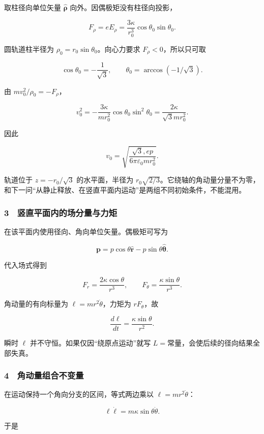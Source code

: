 \documentclass[12pt,a4paper,fontset=fandol]{ctexart}
\begin{document}
取柱径向单位矢量 \(\hat{\boldsymbol\rho}\)
向外。因偶极矩没有柱径向投影，

\[F_\rho=eE_\rho=
\frac{3\kappa}{r_0^3}\cos\theta_0\sin\theta_0.\]

圆轨道柱半径为 \(\rho_0=r_0\sin\theta_0\)。向心力要求
\(F_\rho<0\)，所以只可取

\[\boxed{\cos\theta_0=-\frac1{\sqrt3},\qquad
\theta_0=\arccos(-1/\sqrt3).}\]

由 \(m v_0^2/\rho_0=-F_\rho\)，

\[v_0^2=-\frac{3\kappa}{mr_0^2}
\cos\theta_0\sin^2\theta_0
=\frac{2\kappa}{\sqrt3mr_0^2}.\]

因此

\[\boxed{v_0=\sqrt{\frac{\sqrt3,ep}{6\pi\varepsilon_0mr_0^2}}.}\]

轨道位于 \(z=-r_0/\sqrt3\) 的水平面，半径为
\(r_0\sqrt{2/3}\)。它绕轴的角动量分量不为零，和下一问``从静止释放、在竖直平面内运动''是两组不同初始条件，不能混用。

\subsubsection{3　竖直平面内的场分量与力矩}\label{ux7ad6ux76f4ux5e73ux9762ux5185ux7684ux573aux5206ux91cfux4e0eux529bux77e9}

在该平面内使用径向、角向单位矢量。偶极矩可写为

\[\boldsymbol p=p\cos\theta\hat{\boldsymbol r}
-p\sin\theta\hat{\boldsymbol\theta}.\]

代入场式得到

\[F_r=\frac{2\kappa\cos\theta}{r^3},\qquad
F_\theta=\frac{\kappa\sin\theta}{r^3}.\]

角动量的有向标量为 \(\ell=mr^2\dot\theta\)，力矩为 \(rF_\theta\)，故

\[\frac{d\ell}{dt}=\frac{\kappa\sin\theta}{r^2}.\]

瞬时 \(\ell\) 并不守恒。如果仅因``绕原点运动''就写
\(L=\)常量，会使后续的径向结果全部失真。

\subsubsection{4　角动量组合不变量}\label{ux89d2ux52a8ux91cfux7ec4ux5408ux4e0dux53d8ux91cf}

在运动保持一个角向分支的区间，等式两边乘以 \(\ell=mr^2\dot\theta\)：

\[\ell\dot\ell=m\kappa\sin\theta\dot\theta.\]

于是
\end{document}
